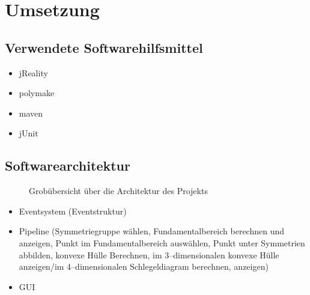 \section{Umsetzung}

\subsection{Verwendete Softwarehilfsmittel}
    \begin{itemize}
        \item jReality~\cite{jreality}
        \item polymake~\cite{polymake}
        \item maven~\cite{maven}
        \item jUnit
    \end{itemize}
    
\subsection{Softwarearchitektur}
     \begin{figure}[tbh]
            \centering
            \caption{Grobübersicht über die Architektur des Projekts}
        \end{figure}
    \begin{itemize}
        \item Eventsystem (Eventstruktur)
        \item Pipeline (Symmetriegruppe wählen, Fundamentalbereich berechnen und anzeigen, Punkt im Fundamentalbereich auswählen, Punkt unter Symmetrien abbilden, konvexe Hülle Berechnen, im 3--dimensionalen konvexe Hülle anzeigen/im 4--dimensionalen Schlegeldiagram berechnen, anzeigen)
        \item GUI
    \end{itemize}
